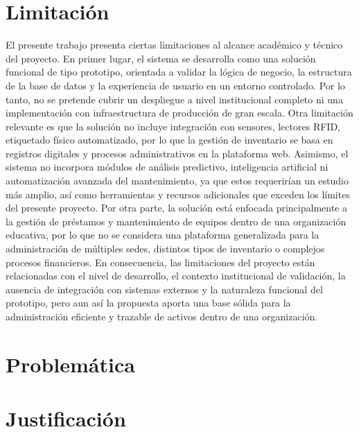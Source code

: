 \section{Limitación}
El presente trabajo presenta ciertas limitaciones al alcance académico y técnico del proyecto. En primer lugar, el sistema se desarrolla como una solución funcional de tipo prototipo, orientada a validar la lógica de negocio, la estructura de la base de datos y la experiencia de usuario en un entorno controlado. Por lo tanto, no se pretende cubrir un despliegue a nivel institucional completo ni una implementación con infraestructura de producción de gran escala.
Otra limitación relevante es que la solución no incluye integración con sensores, lectores RFID, etiquetado físico automatizado, por lo que la gestión de inventario se basa en registros digitales y procesos administrativos en la plataforma web.
Asimismo, el sistema no incorpora módulos de análisis predictivo, inteligencia artificial ni automatización avanzada del mantenimiento, ya que estos requerirían un estudio más amplio, así como herramientas y recursos adicionales que exceden los límites del presente proyecto. Por otra parte, la solución está enfocada principalmente a la gestión de préstamos y mantenimiento de equipos dentro de una organización educativa, por lo que no se considera una plataforma generalizada para la administración de múltiples sedes, distintos tipos de inventario o complejos procesos financieros.
En consecuencia, las limitaciones del proyecto están relacionadas con el nivel de desarrollo, el contexto institucional de validación, la ausencia de integración con sistemas externos y la naturaleza funcional del prototipo, pero aun así la propuesta aporta una base sólida para la administración eficiente y trazable de activos dentro de una organización.

\section{Problemática}


\section{Justificación}